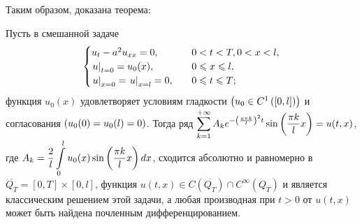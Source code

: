 Таким образом, доказана теорема:
\begin{theorem}
	Пусть в смешанной задаче
	\begin{equation*}
		\begin{cases}
			u_t - a^2u_{xx} = 0, \quad & 0 < t < T, 0 < x < l, \\
			\left. u\right|_{t=0} = u_0(x), \quad & 0 \leqslant x \leqslant l, \\
			\left. u\right|_{x=0} = \left. u\right|_{x=l} = 0, \quad & 0 \leqslant t \leqslant T;
		\end{cases}
	\end{equation*}
	функция $u_0(x)$ удовлетворяет условиям гладкости $\left(u_0 \in C^1\left([0,l]\right)\right)$ и согласования $\left(u_0(0) = u_0(l) = 0\right)$. Тогда ряд $\displaystyle\sum\limits_{k=1}^{+\infty} A_k e^{-\left(\frac{a\pi k}{l}\right)^2t} \sin\left(\dfrac{\pi k}{l}x\right) = u(t,x)$, где $A_k = \dfrac{2}{l} \displaystyle\int\limits_0^l u_0(x) \sin\left(\dfrac{\pi k}{l}x\right) dx$, сходится абсолютно и равномерно в $\overline{Q_T} = [0,T] \times [0,l]$, функция $u(t,x) \in C(\overline{Q_T}) \cap C^{\infty}(Q_T)$ и является классическим решением этой задачи, а любая производная при $t > 0$ от $u(t,x)$ может быть найдена почленным дифференцированием.
\end{theorem}